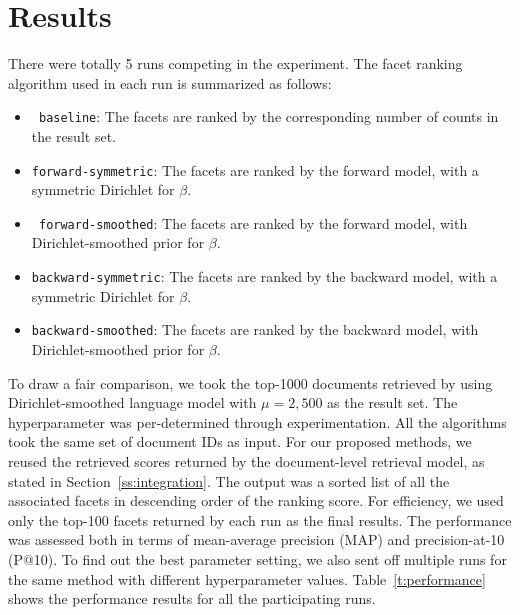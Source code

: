 \section{Results}\label{s:results}


There were totally 5 runs competing in the experiment.  The facet ranking
algorithm used in each run is summarized as follows: \begin{itemize} \item {\tt
baseline}:  The facets are ranked by the corresponding number of counts in the
result set.  \item {\tt forward-symmetric}:  The facets are ranked by the
forward model, with a symmetric Dirichlet for $\beta$.  \item {\tt
forward-smoothed}:  The facets are ranked by the forward model, with
Dirichlet-smoothed prior for $\beta$.  \item {\tt backward-symmetric}:  The
facets are ranked by the backward model, with a symmetric Dirichlet for
$\beta$.  \item {\tt backward-smoothed}:  The facets are ranked by the backward
model, with Dirichlet-smoothed prior for $\beta$.  \end{itemize}

To draw a fair comparison, we took the top-1000 documents retrieved by using
Dirichlet-smoothed language model with $\mu = 2,500$ as the result set.  The
hyperparameter was per-determined through experimentation.  All the algorithms took the
same set of document IDs as input.  For our proposed methods, we reused
the retrieved scores returned by the document-level retrieval model, as
stated in Section~\ref{ss:integration}.  The output was a sorted list of all the
associated facets in descending order of the ranking score.  For efficiency, we
used only the top-100 facets returned by each run as the final results.  The
performance was assessed both in terms of mean-average precision (MAP) and
precision-at-10 (P@10).  To find out the best parameter setting, we also sent off multiple
runs for the same method with different hyperparameter values.
Table~\ref{t:performance} shows the performance results for all the
participating runs.

